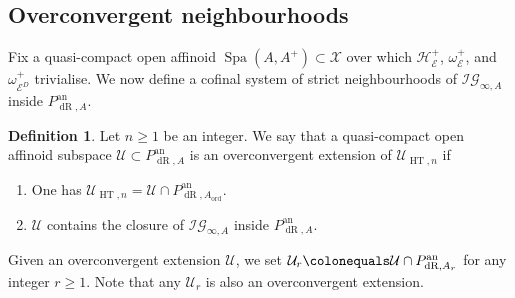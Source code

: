 \documentclass[10pt, oneside]{amsart}
\newcommand{\defeq}{\colonequals}
\numberwithin{equation}{subsection}
\theoremstyle{definition}
\newtheorem{definition}[equation]{Definition}
\theoremstyle{remark}
\newcommand{\opn}[1]{\operatorname{#1}}
\begin{document}
\subsection{Overconvergent neighbourhoods} \label{OverconvergentNBHDSsection}

Fix a quasi-compact open affinoid $\opn{Spa}(A, A^+) \subset \mathcal{X}$ over which $\mathcal{H}_{\mathcal{E}}^+$, $\omega_{\mathcal{E}}^+$, and $\omega_{\mathcal{E}^D}^+$ trivialise. We now define a cofinal system of strict neighbourhoods of $\mathcal{IG}_{\infty, A}$ inside $P_{\opn{dR}, A}^{\opn{an}}$.

\begin{definition} \label{DefOfOverconvergentExtension}
Let $n \geq 1$ be an integer. We say that a quasi-compact open affinoid subspace $\mathcal{U} \subset P_{\opn{dR}, A}^{\opn{an}}$ is an overconvergent extension of $\mathcal{U}_{\opn{HT}, n}$ if
\begin{enumerate}
    \item One has $\mathcal{U}_{\opn{HT}, n} = \mathcal{U} \cap P_{\opn{dR}, A_{\opn{ord}}}^{\opn{an}}$.
    \item $\mathcal{U}$ contains the closure of $\mathcal{IG}_{\infty, A}$ inside $P_{\opn{dR}, A}^{\opn{an}}$.
\end{enumerate}
Given an overconvergent extension $\mathcal{U}$, we set $\mathcal{U}_r \defeq \mathcal{U} \cap P_{\opn{dR}, A_r}^{\opn{an}}$ for any integer $r \geq 1$. Note that any $\mathcal{U}_r$ is also an overconvergent extension.
\end{definition}
\end{document}
